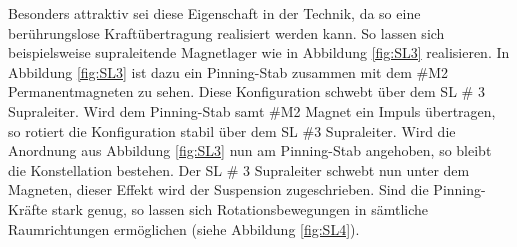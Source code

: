 \noindent
Besonders attraktiv sei diese Eigenschaft in der Technik,
da so eine berührungslose Kraftübertragung realisiert werden kann. So lassen sich
beispielsweise supraleitende Magnetlager wie in Abbildung \ref{fig:SL3} realisieren.
In Abbildung \ref{fig:SL3} ist dazu ein Pinning-Stab zusammen mit dem \#M2
Permanentmagneten zu sehen. Diese Konfiguration schwebt über dem SL \# 3 Supraleiter.
Wird dem Pinning-Stab samt \#M2 Magnet ein Impuls übertragen, so rotiert die Konfiguration
stabil über dem SL \#3 Supraleiter. Wird die Anordnung aus Abbildung \ref{fig:SL3} nun
am Pinning-Stab angehoben, so bleibt die Konstellation bestehen. Der SL \# 3 Supraleiter
schwebt nun unter dem Magneten, dieser Effekt wird der Suspension zugeschrieben.
Sind die Pinning-Kräfte stark genug, so lassen sich Rotationsbewegungen in
sämtliche Raumrichtungen ermöglichen (siehe Abbildung \ref{fig:SL4}).

